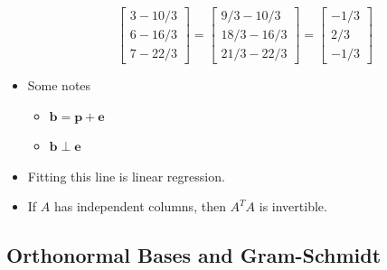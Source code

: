 \documentclass[11pt]{article}
\begin{document}
\begin{itemize}
\[\begin{bmatrix}
        3 - 10/3 \\
        6 - 16/3 \\
        7 - 22/3
    \end{bmatrix} =
    \begin{bmatrix}
        9/3 - 10/3 \\
        18/3 - 16/3 \\
        21/3 - 22/3
    \end{bmatrix} =
    \begin{bmatrix}
        -1/3 \\
        2/3 \\
        -1/3
    \end{bmatrix}
    \]
    \item Some notes
    \begin{itemize}
        \item $\boldsymbol{b} = \boldsymbol{p} + \boldsymbol{e}$
        \item $\boldsymbol{b} \perp \boldsymbol{e}$
    \end{itemize}
    \item Fitting this line is linear regression. 
    \item If $A$ has independent columns, then $A^T A$ is invertible.
\end{itemize}

\subsection{Orthonormal Bases and Gram-Schmidt}
\end{document}
